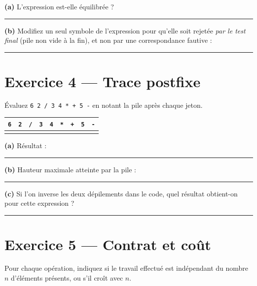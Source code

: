 \documentclass[11pt,a4paper]{article}
\newcommand{\lig}[1]{\rule{#1}{0.4pt}}
\begin{document}
\vspace{0.3cm}
\noindent\textbf{(a)} L'expression est-elle équilibrée ? \lig{3cm}

\vspace{0.2cm}
\noindent\textbf{(b)} Modifiez un seul symbole de l'expression pour qu'elle
soit rejetée \emph{par le test final} (pile non vide à la fin), et non par
une correspondance fautive : \lig{7cm}

\section{Exercice 4 --- Trace postfixe}

Évaluez \texttt{6 2 / 3 4 * + 5 -} en notant la pile après chaque jeton.

\vspace{0.3cm}
\begin{center}
\begin{tabular}{ccccccccc}
\toprule
\texttt{6} & \texttt{2} & \texttt{/} & \texttt{3} & \texttt{4} &
\texttt{*} & \texttt{+} & \texttt{5} & \texttt{-} \\
\midrule
\rule{0pt}{1.8cm} & & & & & & & & \\
\bottomrule
\end{tabular}
\end{center}

\vspace{0.3cm}
\noindent\textbf{(a)} Résultat : \lig{2cm}

\vspace{0.2cm}
\noindent\textbf{(b)} Hauteur maximale atteinte par la pile : \lig{2cm}

\vspace{0.2cm}
\noindent\textbf{(c)} Si l'on inverse les deux dépilements dans le code, quel
résultat obtient-on pour cette expression ? \lig{4cm}

\section{Exercice 5 --- Contrat et coût}

Pour chaque opération, indiquez si le travail effectué est indépendant du
nombre $n$ d'éléments présents, ou s'il croît avec $n$.
\end{document}
